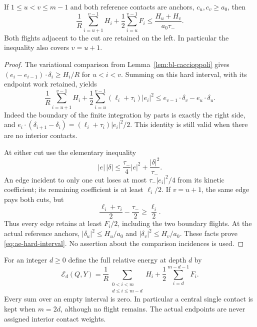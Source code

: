 \begin{lemma}
\label{lem:ae-hard-interval}
If $1\le u<v\le m-1$ and both reference contacts are anchors,
$c_u,c_v\ge a_0$, then
\begin{equation}\label{eq:ae-hard-interval}
 \frac1R\sum_{i=u+1}^{v-1}H_i+
           \frac12\sum_{i=u}^{v-1}F_i
       \le\frac{H_u+H_v}{a_0\tau_-}.
\end{equation}
Both flights adjacent to the cut are retained on the left.  In
particular the inequality also covers $v=u+1$.
\end{lemma}
\begin{proof}
The variational comparison from Lemma~\ref{lem:bl-caccioppoli} gives
$(e_i-e_{i-1})\cdot\delta_i\ge H_i/R$ for $u<i<v$.
Summing on this hard interval, with its endpoint work retained, yields
\begin{equation}\label{eq:ae-hard-work}
 \frac1R\sum_{i=u+1}^{v-1}H_i+
 \frac12\sum_{i=u}^{v-1}(\ell_i+\tau_i)|e_i|^2
 \le e_{v-1}\cdot\delta_v-e_u\cdot\delta_u.
\end{equation}
Indeed the boundary of the finite integration by parts is exactly
the right side, and
$e_i\cdot(\delta_{i+1}-\delta_i)
 =(\ell_i+\tau_i)|e_i|^2/2$.  This identity is still valid when
there are no interior contacts.

At either cut use the elementary inequality
\[
 |e|\,|\delta|\le\frac{\tau_-}{4}|e|^2
                           +\frac{|\delta|^2}{\tau_-}.
\]
An edge incident to only one cut loses at most $\tau_-|e_i|^2/4$
from its kinetic coefficient; its remaining coefficient is at least
$\ell_i/2$.  If $v=u+1$, the same edge pays both cuts, but
\[
 \frac{\ell_i+\tau_i}{2}-\frac{\tau_-}{2}
                         \ge\frac{\ell_i}{2}.
\]
Thus every edge retains at least $F_i/2$, including the two boundary
flights.  At the actual reference anchors,
$|\delta_u|^2\le H_u/a_0$ and
$|\delta_v|^2\le H_v/a_0$.  These facts prove
\eqref{eq:ae-hard-interval}.  No assertion about the comparison
incidences is used.
\end{proof}

For an integer $d\ge0$ define the full relative energy at depth $d$ by
\begin{equation}\label{eq:ae-depth-energy}
 \mathcal E_d(Q,Y)=
 \frac1R\sum_{\substack{0<i<m\\d\le i\le m-d}}H_i+
                  \frac12\sum_{i=d}^{m-d-1}F_i.
\end{equation}
Every sum over an empty interval is zero.  In particular a central
single contact is kept when $m=2d$, although no flight remains.
The actual endpoints are never assigned interior contact weights.

